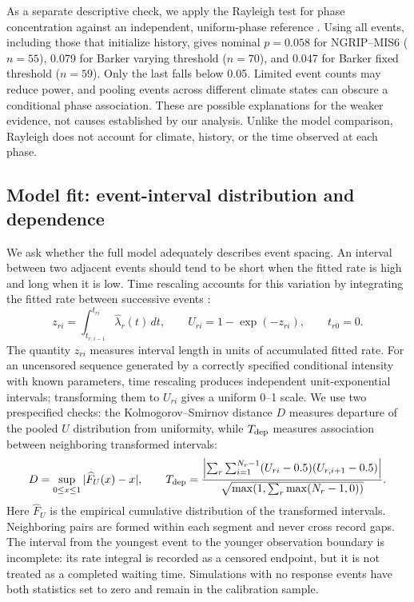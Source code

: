 \documentclass[11pt]{article}
\begin{document}
As a separate descriptive check, we apply the Rayleigh test for phase concentration against an independent, uniform-phase reference \citep{mardia2000directional}. Using all events, including those that initialize history, gives nominal $p=0.058$ for NGRIP--MIS6 ($n=55$), 0.079 for Barker varying threshold ($n=70$), and 0.047 for Barker fixed threshold ($n=59$). Only the last falls below 0.05. Limited event counts may reduce power, and pooling events across different climate states can obscure a conditional phase association. These are possible explanations for the weaker evidence, not causes established by our analysis. Unlike the model comparison, Rayleigh does not account for climate, history, or the time observed at each phase.

\subsection*{Model fit: event-interval distribution and dependence}

We ask whether the full model adequately describes event spacing. An interval between two adjacent events should tend to be short when the fitted rate is high and long when it is low. Time rescaling accounts for this variation by integrating the fitted rate between successive events \citep{brown2002rescaling}: 
\begin{equation}
 z_{ri}=\int_{t_{r,i-1}}^{t_{ri}}\widehat\lambda_r(t)\,dt,\qquad U_{ri}=1-\exp(-z_{ri}),\qquad t_{r0}=0.
\end{equation}
The quantity $z_{ri}$ measures interval length in units of accumulated fitted rate. For an uncensored sequence generated by a correctly specified conditional intensity with known parameters, time rescaling produces independent unit-exponential intervals; transforming them to $U_{ri}$ gives a uniform 0--1 scale. We use two prespecified checks: the Kolmogorov--Smirnov distance $D$ measures departure of the pooled $U$ distribution from uniformity, while $T_{\rm dep}$ measures association between neighboring transformed intervals:
\begin{equation}
 D=\sup_{0\leq x\leq1}|\widehat F_U(x)-x|,\qquad
 T_{\rm dep}=\frac{\left|\sum_r\sum_{i=1}^{N_r-1}(U_{ri}-0.5)(U_{r,i+1}-0.5)\right|}{\sqrt{\max(1,\sum_r\max(N_r-1,0))}}.
\end{equation}
Here $\widehat F_U$ is the empirical cumulative distribution of the transformed intervals. Neighboring pairs are formed within each segment and never cross record gaps. The interval from the youngest event to the younger observation boundary is incomplete: its rate integral is recorded as a censored endpoint, but it is not treated as a completed waiting time. Simulations with no response events have both statistics set to zero and remain in the calibration sample.
\end{document}
